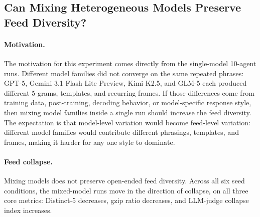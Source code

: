 \documentclass[11pt]{article}
\begin{document}
\subsection{Can Mixing Heterogeneous Models Preserve Feed Diversity?}
\label{subsec:mixing-models}

\paragraph{Motivation.}
The motivation for this experiment comes directly from the single-model 10-agent runs. Different model families did not converge on the same repeated phrases: GPT-5, Gemini 3.1 Flash Lite Preview, Kimi K2.5, and GLM-5 each produced different 5-grams, templates, and recurring frames. If those differences come from training data, post-training, decoding behavior, or model-specific response style, then mixing model families inside a single run should increase the feed diversity. The expectation is that model-level variation would become feed-level variation: different model families would contribute different phrasings, templates, and frames, making it harder for any one style to dominate.
\paragraph{Feed collapse.}
Mixing models does not preserve open-ended feed diversity. Across all six seed conditions, the mixed-model runs move in the direction of collapse, on all three core metrics: Distinct-5 decreases, gzip ratio decreases, and LLM-judge collapse index increases.
\end{document}
